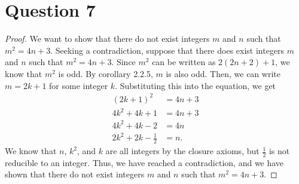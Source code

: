 \documentclass{article}
\begin{document}
\section*{Question 7}
\begin{proof}
    We want to show that there do not exist integers $m$ and $n$ such that $m^2 = 4n + 3$.
    Seeking a contradiction, suppose that there does exist integers $m$ and $n$ such that $m^2 = 4n + 3$.
    Since $m^2$ can be written as $2(2n + 2) + 1$, we know that $m^2$ is odd.
    By corollary 2.2.5, $m$ is also odd.
    Then, we can write $m = 2k + 1$ for some integer $k$.
    Substituting this into the equation, we get
    \begin{align*}
        (2k + 1)^2 &= 4n + 3 \\
        4k^2 + 4k + 1 &= 4n + 3 \\
        4k^2 + 4k - 2 &= 4n \\
        2k^2 + 2k - \frac{1}{2} &= n.
    \end{align*}
    We know that $n$, $k^2$, and $k$ are all integers by the closure axioms, but $\frac{1}{2}$ is not reducible to an integer.
    Thus, we have reached a contradiction, and we have shown that there do not exist integers $m$ and $n$ such that $m^2 = 4n + 3$.
\end{proof}
\end{document}
